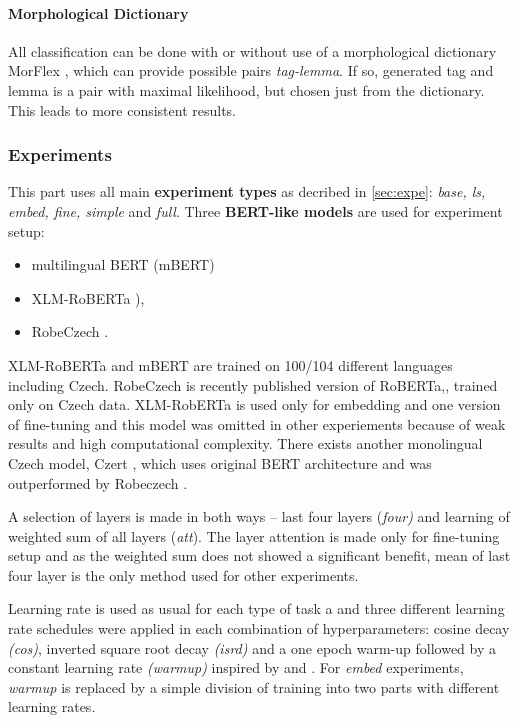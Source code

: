 

\paragraph{Morphological Dictionary} All classification can be done with or without use of a morphological dictionary MorFlex \citep{11234/1-1834}, which can provide possible pairs \textit{tag-lemma}. If so, generated tag and lemma is a pair with maximal likelihood, but chosen just from the dictionary. This leads to more consistent results. 



\subsubsection{Experiments}
This part uses all main \textbf{experiment types} as decribed in \ref{sec:expe}: \textit{base, ls, embed, fine, simple} and \textit{full}. Three \textbf{BERT-like models} are used for experiment setup:
\begin{itemize}
\item multilingual BERT (mBERT) \citep{Devlin2019} 
\item XLM-RoBERTa \citep{Conneau2019}), 
\item RobeCzech \citep{Straka2021}.
\end{itemize}
XLM-RoBERTa and mBERT are trained on 100/104 different languages including Czech. RobeCzech is recently published version of RoBERTa,, trained only on Czech data. XLM-RobERTa is used only for embedding and one version of fine-tuning and this model was omitted in other experiements because of weak results and high computational complexity. There exists another monolingual Czech model, Czert \citep{Sido2021}, which uses original BERT architecture and was outperformed by Robeczech \citep{Straka2021}. \par
A selection of layers is made in both ways -- last four layers (\textit{four)} and learning of weighted sum of all layers (\textit{att}). The layer attention is made only for fine-tuning setup and as the weighted sum does not showed a significant benefit, mean of last four layer is the only method used for other experiments.
 \par Learning rate is used as usual for each type of task a and three different learning rate schedules were applied in each combination of hyperparameters: cosine decay \textit{(cos)}, inverted square root decay \textit{(isrd)} and a one epoch warm-up followed by a constant learning rate \textit{(warmup)} inspired by \citep{Kondratyuk2019} and \citep{Ruder2018}. For \textit{embed} experiments, \textit{warmup} is replaced by  a simple division of training into two parts with different learning rates. 
 
